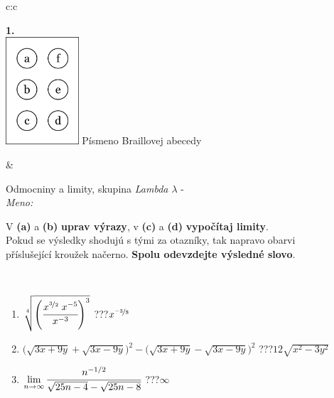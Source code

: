 \documentclass[10pt]{report}
\begin{document}
\begin{tabular}{c:c}
\begin{minipage}[c][104.5mm][t]{0.5\linewidth}
\begin{center}
\begin{minipage}{0.20\linewidth}
\begin{center}
{\Huge\bfseries 1.} \\[2mm]
\includegraphics[height=40mm]{../images/braille.png}
{\small Písmeno Braillovej abecedy}
\end{center}
\end{minipage}
\end{center}
\end{minipage}
&
\begin{minipage}[c][104.5mm][t]{0.5\linewidth}
\begin{center}
\vspace{7mm}
{\huge Odmocniny a limity, skupina \textit{Lambda $\lambda$} -}\\[5mm]
\textit{Meno:}\phantom{xxxxxxxxxxxxxxxxxxxxxxxxxxxxxxxxxxxxxxxxxxxxxxxxxxxxxxxxxxxxxxxxx}\\[5mm]
\begin{minipage}{0.95\linewidth}
\begin{center}
V \textbf{(a)} a \textbf{(b)} \textbf{uprav výrazy}, v \textbf{(c)} a \textbf{(d)} \textbf{vypočítaj limity}.\\Pokud se výsledky shodujú s tými za otazníky, tak napravo obarvi\\příslušející kroužek načerno. \textbf{Spolu odevzdejte výsledné slovo}.
\end{center}
\end{minipage}
\\[1mm]
\begin{minipage}{0.79\linewidth}
\begin{center}
\begin{varwidth}{\linewidth}
\begin{enumerate}
\small
\item $\sqrt[4]{\left(\cfrac{x^{\nicefrac{3}{2}}\;x^{-5}}{x^{-3}}\right)^{3}}$\quad \dotfill\; ???\;\dotfill \quad $x^{\nicefrac{-3}{8}}$
\item {\footnotesize{\scriptsize$\big(\sqrt{3x+9y}+\sqrt{3x-9y}\big)^2-\big(\sqrt{3x+9y}-\sqrt{3x-9y}\big)^2$}\quad \dotfill\; ???\;\dotfill \quad $12\sqrt{x^2-3y^2}$}
\item $\lim\limits_{n\to\infty}\cfrac{n^{-1/2}}{\sqrt{25n-4}-\sqrt{25n-8}}$\quad \dotfill\; ???\;\dotfill \quad $\infty$

\end{enumerate}
\end{varwidth}
\end{center}
\end{minipage}
\end{center}
\end{minipage}
\end{tabular}
\end{document}
